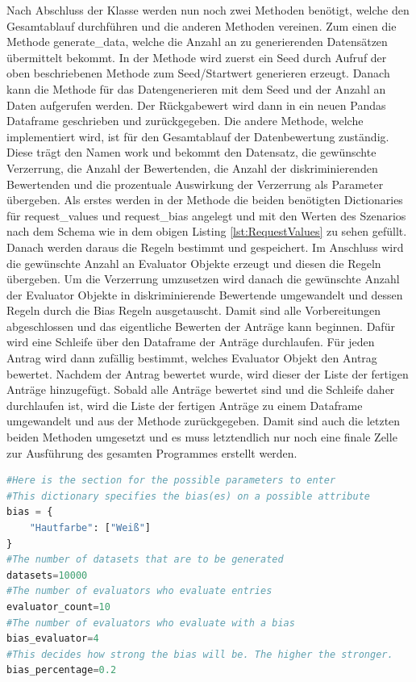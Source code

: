 \begin{onehalfspace}
Nach Abschluss der Klasse werden nun noch zwei Methoden benötigt, welche den Gesamtablauf durchführen und die anderen Methoden vereinen. Zum einen die Methode \glqq{}generate\_data\grqq{}, welche die Anzahl an zu generierenden Datensätzen übermittelt bekommt. In der Methode wird zuerst ein Seed durch Aufruf der oben beschriebenen Methode zum Seed/Startwert generieren erzeugt. Danach kann die Methode für das Datengenerieren mit dem Seed und der Anzahl an Daten aufgerufen werden. Der Rückgabewert wird dann in ein neuen Pandas Dataframe geschrieben und zurückgegeben. Die andere Methode, welche implementiert wird, ist für den Gesamtablauf der Datenbewertung zuständig. Diese trägt den Namen \glqq{}work\grqq{} und bekommt den Datensatz, die gewünschte Verzerrung, die Anzahl der Bewertenden, die Anzahl der diskriminierenden Bewertenden und die prozentuale Auswirkung der Verzerrung als Parameter übergeben. Als erstes werden in der Methode die beiden benötigten Dictionaries für \glqq{}request\_values und request\_bias\grqq{} angelegt und mit den Werten des Szenarios nach dem Schema wie in dem obigen Listing \ref{lst:RequestValues} zu sehen gefüllt. Danach werden daraus die Regeln bestimmt und gespeichert. Im Anschluss wird die gewünschte Anzahl an \glqq{}Evaluator\grqq{} Objekte erzeugt und diesen die Regeln übergeben. Um die Verzerrung umzusetzen wird danach die gewünschte Anzahl der \glqq{}Evaluator\grqq{} Objekte in diskriminierende Bewertende umgewandelt und dessen Regeln durch die Bias Regeln ausgetauscht. Damit sind alle Vorbereitungen abgeschlossen und das eigentliche Bewerten der Anträge kann beginnen. Dafür wird eine Schleife über den Dataframe der Anträge durchlaufen. Für jeden Antrag wird dann zufällig bestimmt, welches \glqq{}Evaluator\grqq{} Objekt den Antrag bewertet. Nachdem der Antrag bewertet wurde, wird dieser der Liste der fertigen Anträge hinzugefügt. Sobald alle Anträge bewertet sind und die Schleife daher durchlaufen ist, wird die Liste der fertigen Anträge zu einem Dataframe umgewandelt und aus der Methode zurückgegeben. 
Damit sind auch die letzten beiden Methoden umgesetzt und es muss letztendlich nur noch eine finale Zelle zur Ausführung des gesamten Programmes erstellt werden.\\
\begin{lstlisting}[language=Python,label={lst:Sz1finalCell},caption=Letzte Zelle des Szenario der Bewährungsantrag für die Interaktion des Benutzenden]
#Here is the section for the possible parameters to enter
#This dictionary specifies the bias(es) on a possible attribute
bias = {
    "Hautfarbe": ["Weiß"]
}
#The number of datasets that are to be generated
datasets=10000
#The number of evaluators who evaluate entries
evaluator_count=10
#The number of evaluators who evaluate with a bias
bias_evaluator=4
#This decides how strong the bias will be. The higher the stronger.
bias_percentage=0.2


\end{lstlisting}
\end{onehalfspace}
